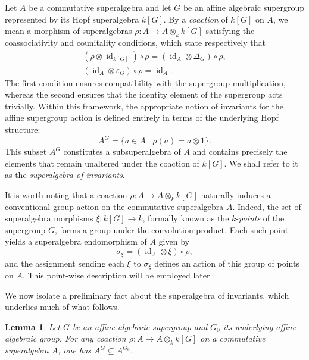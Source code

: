 \documentclass[11pt,a4paper,reqno,noamsfonts]{amsart}
\numberwithin{equation}{section}
\newtheorem{lemma}[theorem]{Lemma}
\theoremstyle{definition}
\theoremstyle{remark}
\DeclareMathOperator{\id}{id}
\begin{document}
Let $A$ be a commutative superalgebra and let $G$ be an affine algebraic supergroup represented by its Hopf superalgebra $k[G]$. By a \emph{coaction} of $k[G]$ on $A$, we mean a morphism of superalgebras $\rho \colon A \to A \otimes_k k[G]$ satisfying the coassociativity and counitality conditions, which state respectively that
\begin{equation}
\begin{gathered}
(\rho \otimes \id_{k[G]}) \circ \rho = (\id_A \otimes \Delta_G) \circ \rho, \\ 
(\id_A \otimes \varepsilon_G) \circ \rho = \id_A.
\end{gathered}
\end{equation}
The first condition ensures compatibility with the supergroup multiplication, whereas the second ensures that the identity element of the supergroup acts trivially. Within this framework, the appropriate notion of invariants for the affine supergroup action is defined entirely in terms of the underlying Hopf structure:
\begin{equation}\label{eq:3.2}
A^{G}=\{ a \in A \mid \rho(a) = a \otimes 1 \}.
\end{equation}
This subset $A^G$ constitutes a subsuperalgebra of $A$ and contains precisely the elements that remain unaltered under the coaction of $k[G]$. We shall refer to it as the \emph{superalgebra of invariants}.

It is worth noting that a coaction $\rho \colon A \to A \otimes_k k[G]$ naturally induces a conventional group action on the commutative superalgebra $A$. Indeed, the set of superalgebra morphisms $\xi \colon k[G] \to k$, formally known as the $k$-\emph{points} of the supergroup $G$, forms a group under the convolution product. Each such point yields a superalgebra endomorphism of $A$ given by
\begin{equation}
\sigma_{\xi} = (\id_A \otimes \xi) \circ \rho,
\end{equation}
and the assignment sending each $\xi$ to $\sigma_{\xi}$ defines an action of this group of points on $A$. This point-wise description will be employed later.

We now isolate a preliminary fact about the superalgebra of invariants, which underlies much of what follows.

\begin{lemma}\label{lem:3.1}
Let $G$ be an affine algebraic supergroup and $G_0$ its underlying affine algebraic group. For any coaction $\rho \colon A \to A \otimes_k k[G]$ on a commutative superalgebra $A$, one has $A^{G} \subseteq A^{G_0}$. 
\end{lemma}
\end{document}
